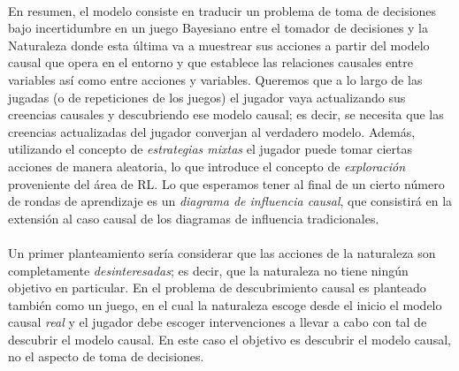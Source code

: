 \documentclass[11pt]{article}
\theoremstyle{plain}
\begin{document}
\\
En resumen, el modelo consiste en traducir un problema de toma de decisiones bajo incertidumbre en un juego Bayesiano entre el tomador de decisiones y la Naturaleza donde esta última va a muestrear sus acciones a partir del modelo causal que opera en el entorno y que establece las relaciones causales entre variables así como entre acciones y variables. Queremos que a lo largo de las jugadas (o de repeticiones de los juegos) el jugador vaya actualizando sus creencias causales y descubriendo ese modelo causal; es decir, se necesita que las creencias actualizadas del jugador converjan al verdadero modelo. Además, utilizando el concepto de \textit{estrategias mixtas} el jugador puede tomar ciertas acciones de manera aleatoria, lo que introduce el concepto de \textit{exploración} proveniente del área de RL. Lo que esperamos tener al final de un cierto número de rondas de aprendizaje es un \textit{diagrama de influencia causal}, que consistirá en la extensión al caso causal de los diagramas de influencia tradicionales.\\
\\
Un primer planteamiento sería considerar que las acciones de la naturaleza son completamente \textit{desinteresadas}; es decir, que la naturaleza no tiene ningún objetivo en particular. En \cite{eberhardt2008causal} el problema de descubrimiento causal es planteado también como un juego, en el cual la naturaleza escoge desde el inicio el modelo causal \textit{real} y el jugador debe escoger intervenciones a llevar a cabo con tal de descubrir el modelo causal. En este caso el objetivo es descubrir el modelo causal, no el aspecto de toma de decisiones.
\end{document}
